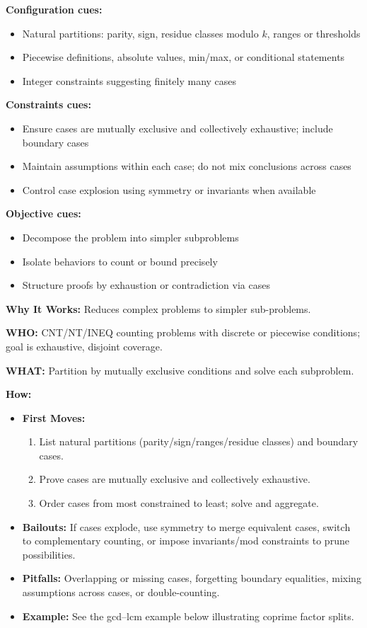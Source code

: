 \documentclass[12pt]{article}
\begin{document}
\textbf{Configuration cues:}
\begin{itemize}
    \item Natural partitions: parity, sign, residue classes modulo $k$, ranges or thresholds
    \item Piecewise definitions, absolute values, min/max, or conditional statements
    \item Integer constraints suggesting finitely many cases
\end{itemize}

\textbf{Constraints cues:}
\begin{itemize}
    \item Ensure cases are mutually exclusive and collectively exhaustive; include boundary cases
    \item Maintain assumptions within each case; do not mix conclusions across cases
    \item Control case explosion using symmetry or invariants when available
\end{itemize}

\textbf{Objective cues:}
\begin{itemize}
    \item Decompose the problem into simpler subproblems
    \item Isolate behaviors to count or bound precisely
    \item Structure proofs by exhaustion or contradiction via cases
\end{itemize}

\textbf{Why It Works:} Reduces complex problems to simpler sub-problems.

\textbf{WHO:} CNT/NT/INEQ counting problems with discrete or piecewise conditions; goal is exhaustive, disjoint coverage.

\textbf{WHAT:} Partition by mutually exclusive conditions and solve each subproblem.

\textbf{How:}
\begin{itemize}
    \item \textbf{First Moves:}
    \begin{enumerate}[nosep]
        \item List natural partitions (parity/sign/ranges/residue classes) and boundary cases.
        \item Prove cases are mutually exclusive and collectively exhaustive.
        \item Order cases from most constrained to least; solve and aggregate.
    \end{enumerate}
    \item \textbf{Bailouts:} If cases explode, use symmetry to merge equivalent cases, switch to complementary counting, or impose invariants/mod constraints to prune possibilities.
    \item \textbf{Pitfalls:} Overlapping or missing cases, forgetting boundary equalities, mixing assumptions across cases, or double-counting.
    \item \textbf{Example:} See the gcd–lcm example below illustrating coprime factor splits.
\end{itemize}
\end{document}
